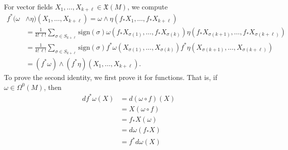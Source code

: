 \documentclass{ximera}
\begin{document}
    \begin{solution}
        For vector fields $X_1, \ldots , X_{k + \ell} \in \mathfrak{X}(M)$, we compute
\begin{align*}
     f^{\ast} (\omega & \wedge \eta )  (X_1, \ldots , X_{k + \ell } )  =  \omega \wedge \eta (f_{\ast} X_1 , \ldots , f_{\ast} X_{k + \ell } ) \\
     & = \frac{1}{k! \, \ell ! }\sum_{\sigma \in S_{k + \ell }} \text{sign} (\sigma) \omega (  f_{\ast} X_{\sigma (1) }, \ldots , f_{\ast} X_{\sigma (k)}  ) \eta (  f_{\ast} X_{\sigma (k + 1 )}, \ldots , f_{\ast} X_{\sigma (k + \ell )}  ) \\
     & = \frac{1}{k! \, \ell ! }\sum_{\sigma \in S_{k + \ell }} \text{sign} (\sigma) f^{\ast}  \omega (   X_{\sigma (1) }, \ldots ,  X_{\sigma (k)}  ) f^{\ast} \eta (  X_{\sigma (k + 1 )}, \ldots , X_{\sigma (k + \ell )}  ) \\
     & = ( f^{\ast} \omega ) \wedge (f^{\ast} \eta ) (X_1, \ldots , X_{k + \ell}). 
\end{align*}
To prove the second identity, we first prove it for functions. That is, if $\omega \in \Omega ^0 (M)$, then
\begin{align*}
    d f^{\ast} \omega  (X) & = d (\omega  \circ f) (X)\\
    & = X (\omega  \circ f) \\
    & = f_{\ast} X (\omega ) \\
    & = d\omega  (f_{\ast} X ) \\
    & = f^{\ast} d \omega (X)
\end{align*}


\end{solution}
\end{document}
